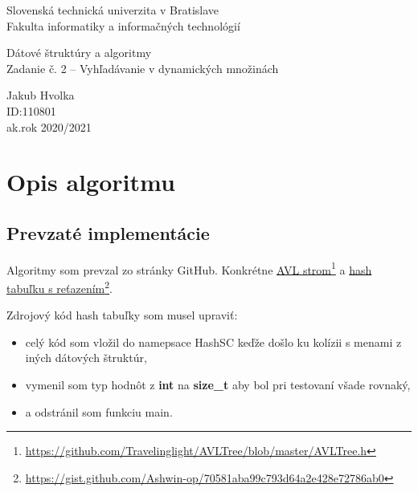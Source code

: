 \documentclass[a4paper,slovak,12pt]{article}
\begin{document}
    \begin{titlepage}
        \begin{center}
            \Large
            Slovenská technická univerzita v Bratislave\\

            Fakulta informatiky a informačných technológií

            \vspace*{\fill}

            \huge
            Dátové štruktúry a algoritmy\\
            \large
            Zadanie č. 2 – Vyhľadávanie v dynamických množinách


            \vspace*{\fill}

            Jakub Hvolka\\
            ID:110801\\
            ak.rok 2020/2021
            \vspace*{2cm}

        \end{center}
    \end{titlepage}

    \tableofcontents

    \newpage


    \section{Opis algoritmu}\label{sec:opis-algoritmu}

    \subsection{Prevzaté implementácie}\label{subsec:prevzate-implementacie}
    Algoritmy som prevzal zo stránky GitHub.
    Konkrétne \href{https://github.com/Travelinglight/AVLTree/blob/master/AVLTree.h}{AVL strom}\footnote{\url{https://github.com/Travelinglight/AVLTree/blob/master/AVLTree.h}}
    a \href{https://gist.github.com/Ashwin-op/70581aba99c793d64a2e428e72786ab0}{hash tabuľku s reťazením}\footnote{\url{https://gist.github.com/Ashwin-op/70581aba99c793d64a2e428e72786ab0}}.

    Zdrojový kód hash tabuľky som musel upraviť:
    \begin{itemize}
        \item celý kód som vložil do namepsace HashSC keďže došlo ku kolízii s menami z iných dátových štruktúr,
        \item vymenil som typ hodnôt z \textbf{int} na \textbf{size\_t} aby bol pri testovaní všade rovnaký,
        \item  a odstránil som funkciu main.
    \end{itemize}
\end{document}
